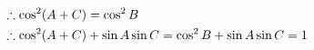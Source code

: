\documentclass[preview]{standalone}
\begin{document}
\begin{align*}
\special{dvisvgm:raw <g id='unique000'>}&\therefore \cos^2(A+C) = \cos^2 B\\ \special{dvisvgm:raw </g>}\special{dvisvgm:raw <g id='unique001'>}&\therefore \cos^2(A+C)+\sin A\sin C=\cos^2 B+\sin A\sin C=1\special{dvisvgm:raw </g>}
\end{align*}
\end{document}

